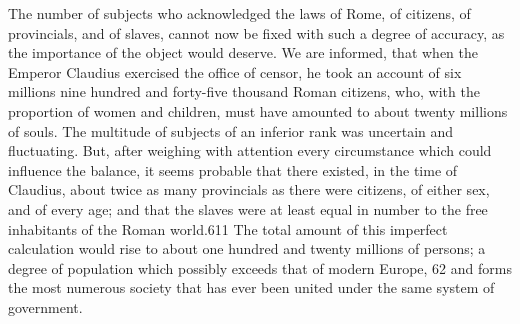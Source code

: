 




The number of subjects who acknowledged the laws of Rome, of
citizens, of provincials, and of slaves, cannot now be fixed with
such a degree of accuracy, as the importance of the object would
deserve. We are informed, that when the Emperor Claudius
exercised the office of censor, he took an account of six
millions nine hundred and forty-five thousand Roman citizens,
who, with the proportion of women and children, must have
amounted to about twenty millions of souls. The multitude of
subjects of an inferior rank was uncertain and fluctuating. But,
after weighing with attention every circumstance which could
influence the balance, it seems probable that there existed, in
the time of Claudius, about twice as many provincials as there
were citizens, of either sex, and of every age; and that the
slaves were at least equal in number to the free inhabitants of
the Roman world.611 The total amount of this imperfect
calculation would rise to about one hundred and twenty millions
of persons; a degree of population which possibly exceeds that of
modern Europe, 62 and forms the most numerous society that has
ever been united under the same system of government.

